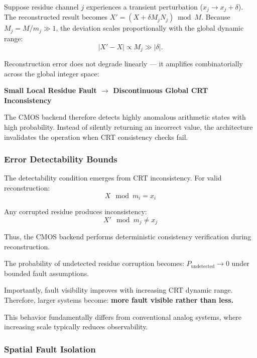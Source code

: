 \documentclass[journal]{IEEEtran}
\begin{document}
Suppose residue channel $j$ experiences a transient perturbation ($x_j \to x_j + \delta$). The reconstructed result becomes $X' = (X + \delta M_j N_j) \bmod M$. Because $M_j = M / m_j \gg 1$, the deviation scales proportionally with the global dynamic range:
\begin{equation}
|X' - X| \propto M_j \gg |\delta|.
\end{equation}

Reconstruction error does not degrade linearly --- it amplifies combinatorially across the global integer space:

\textbf{Small Local Residue Fault $\rightarrow$ Discontinuous Global CRT Inconsistency}

The CMOS backend therefore detects highly anomalous arithmetic states with high probability. Instead of silently returning an incorrect value, the architecture invalidates the operation when CRT consistency checks fail.



\subsubsection{\textbf{Error Detectability Bounds}}

The detectability condition emerges from CRT inconsistency.
For valid reconstruction:
\begin{equation}
X \mod m_i = x_i
\end{equation}

Any corrupted residue produces inconsistency:
\begin{equation}
X ' \mod m_j \neq  x_j 
\end{equation}

Thus, the CMOS backend performs deterministic consistency verification during reconstruction.

The probability of undetected residue corruption becomes:
$P_{\mathrm{undetected}} \to 0$
under bounded fault assumptions.

Importantly, fault visibility improves with increasing CRT dynamic range.
Therefore, larger systems become:
\textbf{more fault visible rather than less.}

This behavior fundamentally differs from conventional analog systems, where increasing scale typically reduces observability.

\subsubsection{\textbf{Spatial Fault Isolation}}
\end{document}
